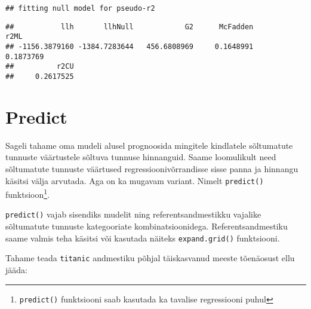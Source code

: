 \documentclass[
]{book}
\newenvironment{Shaded}{\begin{snugshade}}{\end{snugshade}}
\newcommand{\AttributeTok}[1]{\textcolor[rgb]{0.77,0.63,0.00}{#1}}
\newcommand{\CommentTok}[1]{\textcolor[rgb]{0.56,0.35,0.01}{\textit{#1}}}
\newcommand{\FunctionTok}[1]{\textcolor[rgb]{0.00,0.00,0.00}{#1}}
\newcommand{\NormalTok}[1]{#1}
\newcommand{\OtherTok}[1]{\textcolor[rgb]{0.56,0.35,0.01}{#1}}
\newcommand{\SpecialCharTok}[1]{\textcolor[rgb]{0.00,0.00,0.00}{#1}}
\newcommand{\StringTok}[1]{\textcolor[rgb]{0.31,0.60,0.02}{#1}}
\begin{document}
\begin{verbatim}
## fitting null model for pseudo-r2
\end{verbatim}

\begin{verbatim}
##           llh       llhNull            G2      McFadden          r2ML 
## -1156.3879160 -1384.7283644   456.6808969     0.1648991     0.1873769 
##          r2CU 
##     0.2617525
\end{verbatim}

\hypertarget{predict}{%
\section{Predict}\label{predict}}

Sageli tahame oma mudeli alusel prognoosida mingitele kindlatele sõltumatute tunnuste väärtustele sõltuva tunnuse hinnanguid. Saame loomulikult need sõltumatute tunnuste väärtused regressioonivõrrandisse sisse panna ja hinnangu käsitsi välja arvutada. Aga on ka mugavam variant. Nimelt \texttt{predict()} funktsioon\footnote{\texttt{predict()} funktsiooni saab kasutada ka tavalise regressiooni puhul}.

\texttt{predict()} vajab sisendiks mudelit ning referentsandmestikku vajalike sõltumatute tunnuste kategooriate kombinatsioonidega. Referentsandmestiku saame valmis teha käsitsi või kasutada näiteks \texttt{expand.grid()} funktsiooni.

Tahame teada \texttt{titanic} andmestiku põhjal täiskasvanud meeste tõenäosust ellu jääda:

\begin{Shaded}
\end{Shaded}
\end{document}
